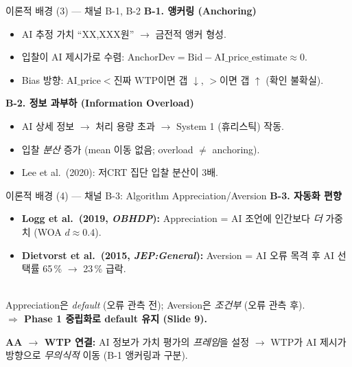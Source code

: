 \documentclass[aspectratio=169]{beamer}
\begin{document}
\begin{frame}{이론적 배경 (3) --- 채널 B-1, B-2}
  \textbf{B-1. 앵커링 (Anchoring)}
  \begin{itemize}
    \item AI 추정 가치 ``XX,XXX원'' $\rightarrow$ 금전적 앵커 형성.
    \item 입찰이 AI 제시가로 수렴: $\mathrm{AnchorDev} = \mathrm{Bid} - \mathrm{AI\_price\_estimate} \approx 0$.
    \item Bias 방향: $\mathrm{AI\_price} < \text{진짜 WTP}$이면 갭 $\downarrow$, $>$이면 갭 $\uparrow$ (확인 불확실).
  \end{itemize}

  \vspace{0.4em}
  \textbf{B-2. 정보 과부하 (Information Overload)}
  \begin{itemize}
    \item AI 상세 정보 $\rightarrow$ 처리 용량 초과 $\rightarrow$ System 1 (휴리스틱) 작동.
    \item 입찰 \emph{분산} 증가 (mean 이동 없음; overload $\neq$ anchoring).
    \item Lee et al.\ (2020): 저CRT 집단 입찰 분산이 3배.
  \end{itemize}
\end{frame}

\begin{frame}{이론적 배경 (4) --- 채널 B-3: Algorithm Appreciation/Aversion}
  \textbf{B-3. 자동화 편향}
  \begin{itemize}
    \item \textbf{Logg et al.\ (2019, \emph{OBHDP}):} Appreciation = AI 조언에 인간보다 \emph{더} 가중치 (WOA $d \approx 0.4$).
    \item \textbf{Dietvorst et al.\ (2015, \emph{JEP:General}):} Aversion = AI 오류 목격 후 AI 선택률 65\,\% $\rightarrow$ 23\,\% 급락.
  \end{itemize}

  \vspace{0.4em}
  \\
  Appreciation은 \emph{default} (오류 관측 전); Aversion은 \emph{조건부} (오류 관측 후).\\
  \textbf{$\Rightarrow$ Phase 1 중립화로 default 유지 (Slide 9).}

  \vspace{0.4em}
  \textbf{AA $\rightarrow$ WTP 연결:} AI 정보가 가치 평가의 \emph{프레임}을 설정 $\rightarrow$ WTP가 AI 제시가 방향으로 \emph{무의식적} 이동 (B-1 앵커링과 구분).
\end{frame}
\end{document}
